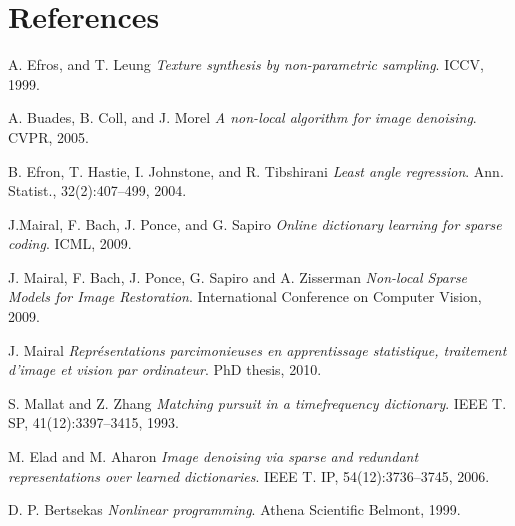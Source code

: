 \documentclass{ipol}
\begin{document}
\section{References}

\begin{thebibliography}{9}

	A. Efros, and T. Leung
	\emph{Texture synthesis by non-parametric sampling}.
	ICCV,
	1999.

	A. Buades, B. Coll, and J. Morel
	\emph{A non-local algorithm for image denoising}.
	CVPR,
	2005.

	B. Efron, T. Hastie, I. Johnstone, and R. Tibshirani
	\emph{Least angle regression}. 
	Ann. Statist.,
	32(2):407–499,
	2004.

	J.Mairal, F. Bach, J. Ponce, and G. Sapiro
	\emph{Online dictionary learning for sparse coding}.
	ICML,
	2009.

	J. Mairal, F. Bach, J. Ponce, G. Sapiro and A. Zisserman
	\emph{ Non-local Sparse Models for Image Restoration}.
	International Conference on Computer Vision,
	2009.

	J. Mairal
	\emph{ Représentations parcimonieuses en apprentissage statistique, traitement d’image et
vision par ordinateur}.
	PhD thesis,
	2010.

	S. Mallat and Z. Zhang
 	\emph{Matching pursuit in a timefrequency dictionary}.
	IEEE T. SP,
	41(12):3397–3415,
	1993.

	M. Elad and M. Aharon
	\emph{Image denoising via sparse and redundant representations over learned dictionaries}.
	IEEE T.
	IP, 54(12):3736–3745,
	2006.
	
	D. P. Bertsekas
	\emph{Nonlinear programming}.
	Athena Scientific Belmont,
	1999.

\end{thebibliography}
\end{document}
